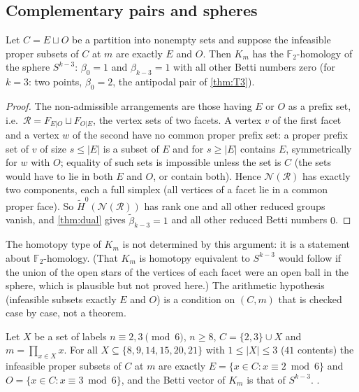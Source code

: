 \subsection{Complementary pairs and spheres}
\begin{theorem}\label{thm:sphere}
Let $C=E\sqcup O$ be a partition into nonempty sets and suppose the infeasible proper subsets of $C$ at $m$ are exactly $E$ and $O$. Then $K_m$ has the $\mathbb F_2$-homology of the sphere $S^{k-3}$: $\beta_0=1$ and $\beta_{k-3}=1$ with all other Betti numbers zero (for $k=3$: two points, $\beta_0=2$, the antipodal pair of \cref{thm:T3}).
\end{theorem}
\begin{proof}
The non-admissible arrangements are those having $E$ or $O$ as a prefix set, i.e.\ $\mathcal R=F_{E|O}\sqcup F_{O|E}$, the vertex sets of two facets. A vertex $v$ of the first facet and a vertex $w$ of the second have no common proper prefix set: a proper prefix set of $v$ of size $s\le|E|$ is a subset of $E$ and for $s\ge|E|$ contains $E$, symmetrically for $w$ with $O$; equality of such sets is impossible unless the set is $C$ (the sets would have to lie in both $E$ and $O$, or contain both). Hence $\mathcal N(\mathcal R)$ has exactly two components, each a full simplex (all vertices of a facet lie in a common proper face). So $\tilde H^0(\mathcal N(\mathcal R))$ has rank one and all other reduced groups vanish, and \cref{thm:dual} gives $\tilde\beta_{k-3}=1$ and all other reduced Betti numbers $0$.
\end{proof}
\begin{remark}[scope]
The homotopy type of $K_m$ is not determined by this argument: it is a statement about $\mathbb F_2$-homology. (That $K_m$ is homotopy equivalent to $S^{k-3}$ would follow if the union of the open stars of the vertices of each facet were an open ball in the sphere, which is plausible but not proved here.) The arithmetic hypothesis (infeasible subsets exactly $E$ and $O$) is a condition on $(C,m)$ that is checked case by case, not a theorem.
\end{remark}
\begin{proposition}\label{prop:realise}
Let $X$ be a set of labels $n\equiv2,3\pmod6$, $n\ge8$, $C=\{2,3\}\cup X$ and $m=\prod_{x\in X}x$. For all $X\subseteq\{8,9,14,15,20,21\}$ with $1\le|X|\le3$ ($41$ contents) the infeasible proper subsets of $C$ at $m$ are exactly $E=\{x\in C:x\equiv2\bmod 6\}$ and $O=\{x\in C:x\equiv3\bmod6\}$, and the Betti vector of $K_m$ is that of $S^{k-3}$. .
\end{proposition}
